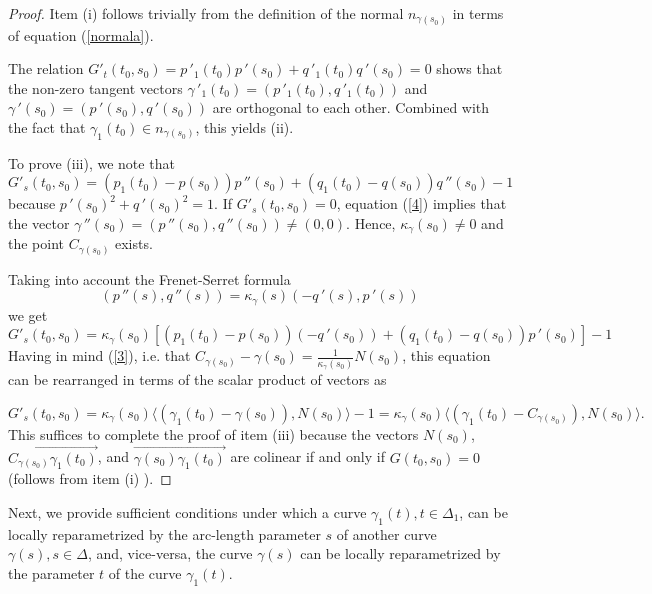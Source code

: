 \documentclass[10pt,a4paper]{amsart}
\def\g{\gamma}
\begin{document}
\begin{proof}
Item (i) follows trivially from
the definition of the normal $n_{\g(s_0)}$ in terms of equation (\ref{normala}).

The relation
$ G'_t(t_0,s_0)= p\,'_1(t_0)p\,'(s_0)+q\,'_1(t_0)q\,'(s_0)=0 $ shows that the non-zero tangent vectors
$\g\,'_1(t_0)=(p\,'_1 (t_0), q\,'_1(t_0))$ and
$\g\,'(s_0)=(p\,'(s_0), q\,'(s_0))$ are orthogonal to each other. Combined with the fact that $\g_1(t_0) \in n_{\g(s_0)}$, this yields (ii).

To prove (iii), we note that
\begin{equation}\label{4}
G'_s(t_0,s_0)=
(p_1(t_0)-p(s_0))p\,''(s_0)+(q_1(t_0)-q(s_0))q\,''(s_0)-1
\end{equation}
 because $p\,'(s_0)^2+ q\,'(s_0)^2=1$.
 If $G'_s(t_0,s_0)=0$, equation (\ref{4}) implies that the vector
 $\g\,''(s_0)=(p\,''(s_0), q\,''(s_0)) \neq (0,0)$.
 Hence,
 $\kappa_{\g}(s_0) \neq 0$ and the point $C_{\g(s_0)}$ exists.

Taking into account the Frenet-Serret formula
\begin{equation}\label{5}
(p\,''(s),q\,''(s)) = \kappa_{\g}(s)(-q\,'(s), p\,'(s))
\end{equation}
we get
\begin{equation}\label{6}
G'_s(t_0,s_0)=
\kappa_{\g}(s_0)[(p_1(t_0)-p(s_0))(-q\,'(s_0))+(q_1(t_0)-q(s_0))p\,'(s_0)]-1
\end{equation}
Having in mind (\ref{3}), i.e. that $C_{\g(s_0)} - \g(s_0) = \frac{1}{\kappa_{\g}(s_0)}N(s_0)$,
this equation can be rearranged in terms of the scalar product of vectors as

\begin{equation}\label{7}
G'_s(t_0,s_0)=\kappa_{\g}(s_0) \langle(\g_1(t_0) - \g(s_0)), N(s_0)\rangle - 1= \kappa_{\g}(s_0) \langle(\g_1(t_0) - C_{\g(s_0)}), N(s_0)\rangle.
\end{equation}
This suffices to complete the proof of item (iii) because the vectors $N(s_0)$, $\overrightarrow{C_{\g(s_0)}\g_1(t_0)}$, and
$\overrightarrow{\g(s_0)\g_1(t_0)}$ are colinear if and only if $G(t_0,s_0)=0$ (follows from item (i) ).
\end{proof}

Next, we provide sufficient conditions under which a curve
$\g_1(t), t \in \Delta_1$, can be locally reparametrized by the  arc-length parameter $s$ of another curve $\g(s), s \in \Delta$, and,
vice-versa, the curve $\g(s)$ can be locally reparametrized by the parameter $t$ of the curve $\g_1(t)$.
\end{document}
